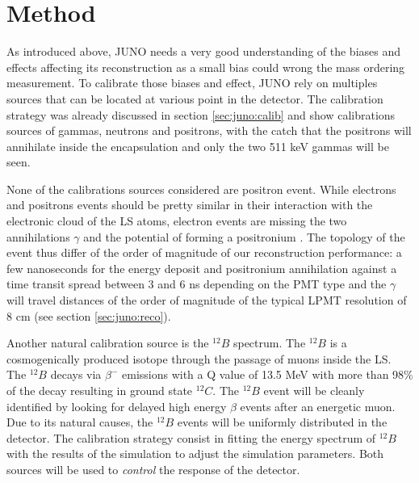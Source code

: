 \documentclass[../main.tex]{subfiles}
\begin{document}
\section{Method}
\label{sec:janne:method}

As introduced above, JUNO needs a very good understanding of the biases and effects affecting its reconstruction as a small bias could wrong the mass ordering measurement. To calibrate those biases and effect, JUNO rely on multiples sources that can be located at various point in the detector. The calibration strategy was already discussed in section \ref{sec:juno:calib} and show calibrations sources of gammas, neutrons and positrons, with the catch that the positrons will annihilate inside the encapsulation and only the two 511 keV gammas will be seen.

None of the calibrations sources considered are positron event. While electrons and positrons events should be pretty similar in their interaction with the electronic cloud of the LS atoms, electron events are missing the two annihilations $\gamma$ and the potential of forming a positronium \cite{schwarz_measurements_2018}. The topology of the event thus differ of the order of magnitude of our reconstruction performance: a few nanoseconds for the energy deposit and positronium annihilation against a time transit spread between 3 and 6 ns depending on the PMT type \cite{rodphai_20-inch_2021, liao_study_2017, li_characterization_2018} and the $\gamma$ will travel distances of the order of magnitude of the typical LPMT resolution of 8 cm (see section \ref{sec:juno:reco}).

Another natural calibration source is the $^{12}B$ spectrum. The $^{12}B$ is a cosmogenically produced isotope through the passage of muons inside the LS. The $^{12}B$ decays via $\beta^-$ emissions with a Q value of 13.5 MeV with more than 98\% of the decay resulting in ground state $^{12}C$. The $^{12}B$ event will be cleanly identified by looking for delayed high energy $\beta$ events after an energetic muon. Due to its natural causes, the $^{12}B$ events will be uniformly distributed in the detector. The calibration strategy consist in fitting the energy spectrum of $^{12}B$ with the results of the simulation to adjust the simulation parameters. Both sources will be used to \textit{control} the response of the detector.
\end{document}
